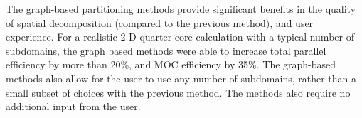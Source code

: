 {{    The graph-based partitioning methods provide significant benefits in the quality of spatial decomposition (compared to the previous method), and user experience.
    For a realistic 2-D quarter core calculation with a typical number of subdomains, the graph based methods were able to increase total parallel efficiency by more than 20\%, and \ac{MOC} efficiency by 35\%.
    The graph-based methods also allow for the user to use any number of subdomains, rather than a small subset of choices with the previous method.
    The methods also require no additional input from the user.
  }

  \printbibliography
}